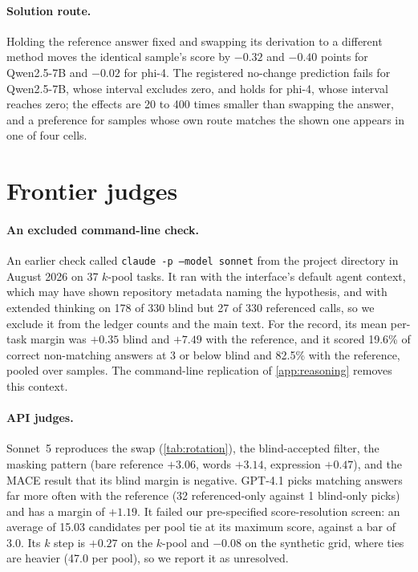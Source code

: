 \paragraph{Solution route.}
Holding the reference answer fixed and swapping its derivation to a different method moves the identical sample's score by $-0.32$ and $-0.40$ points for Qwen2.5-7B and $-0.02$ for phi-4. The registered no-change prediction fails for Qwen2.5-7B, whose interval excludes zero, and holds for phi-4, whose interval reaches zero; the effects are 20 to 400 times smaller than swapping the answer, and a preference for samples whose own route matches the shown one appears in one of four cells.

\FloatBarrier
\section{Frontier judges}
\label{app:frontier}

\paragraph{An excluded command-line check.}
An earlier check called \texttt{claude -p --model sonnet} from the project directory in August 2026 on 37 $k$-pool tasks. It ran with the interface's default agent context, which may have shown repository metadata naming the hypothesis, and with extended thinking on 178 of 330 blind but 27 of 330 referenced calls, so we exclude it from the ledger counts and the main text. For the record, its mean per-task margin was $+0.35$  blind and $+7.49$  with the reference, and it scored 19.6\% of correct non-matching answers at 3 or below blind and 82.5\% with the reference, pooled over samples. The command-line replication of \cref{app:reasoning} removes this context.

\paragraph{API judges.}
Sonnet~5 reproduces the swap (\cref{tab:rotation}), the blind-accepted filter, the masking pattern (bare reference $+3.06$, words $+3.14$, expression $+0.47$), and the \textsc{MACE} result that its blind margin is negative. GPT-4.1 picks matching answers far more often with the reference (32 referenced-only against 1 blind-only picks) and has a margin of $+1.19$. It failed our pre-specified score-resolution screen: an average of 15.03 candidates per pool tie at its maximum score, against a bar of 3.0. Its $k$ step is $+0.27$  on the $k$-pool and $-0.08$  on the synthetic grid, where ties are heavier (47.0 per pool), so we report it as unresolved.

